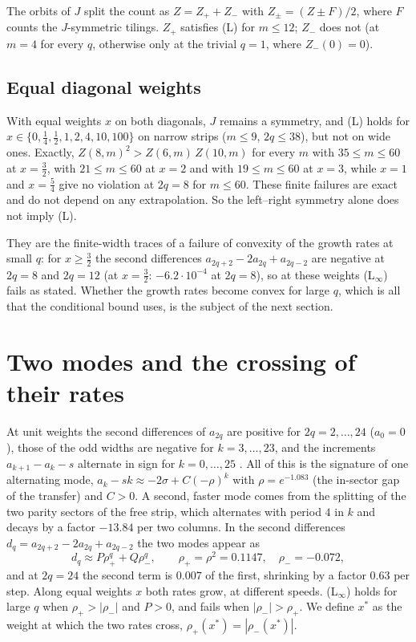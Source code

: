 \documentclass[11pt]{amsart}
\theoremstyle{definition}
\theoremstyle{remark}
\begin{document}
The orbits of $J$ split the count as $Z = Z_+ + Z_-$ with $Z_\pm = (Z \pm F)/2$, where $F$ counts the
$J$-symmetric tilings. $Z_+$ satisfies (L) for $m \le 12$; $Z_-$ does not (at $m = 4$ for every $q$,
otherwise only at the trivial $q = 1$, where $Z_-(0) = 0$).

\subsection{Equal diagonal weights}\label{sec:equal}
With equal weights $x$ on both diagonals, $J$ remains a symmetry, and (L) holds for
$x \in \{0, \tfrac14, \tfrac12, 1, 2, 4, 10, 100\}$ on narrow strips ($m \le 9$, $2q \le 38$), but
not on wide ones. Exactly, $Z(8, m)^2 > Z(6, m)\,Z(10, m)$ for every $m$ with $35 \le m \le 60$ at
$x = \tfrac32$, with $21 \le m \le 60$ at $x = 2$ and with $19 \le m \le 60$ at $x = 3$, while $x = 1$
and $x = \tfrac54$ give no violation at $2q = 8$ for $m \le 60$. These finite failures are exact
and do not depend on any extrapolation. So the left--right symmetry alone does not imply (L).

They are the finite-width traces of a failure of convexity of the growth rates at small $q$: for
$x \ge \tfrac32$ the second differences $a_{2q+2} - 2a_{2q} + a_{2q-2}$ are negative at $2q = 8$ and
$2q = 12$ (at $x = \tfrac32$: $-6.2\cdot10^{-4}$ at $2q = 8$), so at these weights (L$_\infty$) fails
as stated. Whether the growth rates become convex for large $q$, which is all that the conditional
bound uses, is the subject of the next section.

\section{Two modes and the crossing of their rates}\label{sec:modes}
At unit weights the second differences of $a_{2q}$ are positive for $2q = 2, \dots, 24$ ($a_0 = 0$),
those of the odd widths are negative for $k = 3, \dots, 23$, and the increments $a_{k+1} - a_k - s$
alternate in sign for $k = 0, \dots, 25$ \cite[\S8]{rylko2026entropy}. All of this is the
signature of one alternating mode, $a_k - sk \approx -2\sigma + C(-\rho)^k$ with $\rho = e^{-1.083}$
(the in-sector gap of the transfer) and $C > 0$. A second, faster mode comes from the splitting of
the two parity sectors of the free strip, which alternates with period $4$ in $k$ and decays by a
factor $-13.84$ per two columns. In the second differences
$d_q = a_{2q+2} - 2a_{2q} + a_{2q-2}$ the two modes appear as
\[
  d_q \approx P \rho_+^q + Q \rho_-^q, \qquad \rho_+ = \rho^2 = 0.1147,\quad \rho_- = -0.072,
\]
and at $2q = 24$ the second term is $0.007$ of the first, shrinking by a factor $0.63$ per step.
Along equal weights $x$ both rates grow, at different speeds. (L$_\infty$) holds for large $q$ when
$\rho_+ > |\rho_-|$ and $P > 0$, and fails when $|\rho_-| > \rho_+$. We define $x^*$ as the weight at
which the two rates cross, $\rho_+(x^*) = |\rho_-(x^*)|$.
\end{document}
